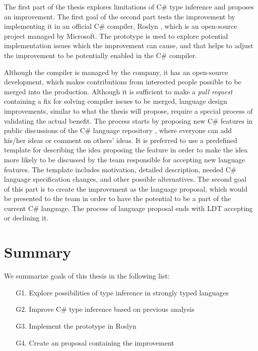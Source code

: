 The first part of the thesis explores limitations of C\# type inference and proposes an improvement.
The first goal of the second part tests the improvement by implementing it in an official C\# compiler, Roslyn \cite{online:langRepo}, which is an open-source project managed by Microsoft.
The prototype is used to explore potential implementation issues which the improvement can cause, and that helps to adjust the improvement to be potentially enabled in the C\# compiler.
\par
Although the compiler is managed by the company, it has an open-source development, which makes contributions from interested people possible to be merged into the production.
Although it is sufficient to make a \textit{pull request} containing a fix for solving compiler issues to be merged, language design improvements, similar to what the thesis will propose, require a special process of validating the actual benefit.
The process starts by proposing new C\# features in public discussions of the C\# language repository \cite{online:langRepo}, where everyone can add his/her ideas or comment on others' ideas. 
It is preferred to use a predefined template \cite{online:proposalTemplate} for describing the idea proposing the feature in order to make the idea more likely to be discussed by the team responsible for accepting new language features. 
The template includes motivation, detailed description, needed C\# language specification \cite{online:langSpec} changes, and other possible alternatives.
The second goal of this part is to create the improvement as the language proposal, which would be presented to the team in order to have the potential to be a part of the current C\# language.
The process of language proposal ends with \ac{LDT} accepting or declining it. 

\section{Summary}

We summarize goals of this thesis in the following list:

\begin{enumerate}
  \item[G1.] Explore possibilities of type inference in strongly typed languages
  \item[G2.] Improve C\# type inference based on previous analysis
  \item[G3.] Implement the prototype in Roslyn
  \item[G4.] Create an proposal containing the improvement
\end{enumerate}